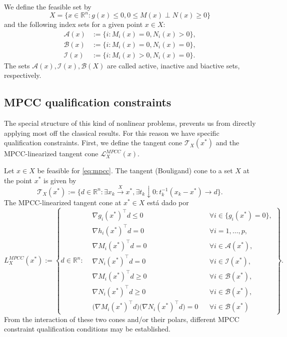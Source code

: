 \documentclass[review,onefignum,onetabnum]{siamonline190516}
\begin{document}
We define the feasible set by 
$$
X=\{x\in\mathbb{R}^n:g(x)\leq 0, 0\leq M(x)\perp N(x)\geq 0\}
$$
and the following index sets for a given point $x\in X:$
\begin{align*}
  \mathcal{A}(x)&:=\{i: M_i(x)=0, N_i(x)>0\},\\
  \mathcal{B}(x)&:=\{i:M_i(x)=0, N_i(x)=0\},\\
  \mathcal{I}(x)&:=\{i:M_i(x)>0, N_i(x)=0\}.
\end{align*}
The sets $\mathcal{A}(x), \mathcal{I}(x), \mathcal{B}(X)$ are called active, inactive and biactive sets, respectively. 

\subsection{MPCC qualification constraints} The special structure of this kind of nonlinear problems, prevents us from directly applying most off the classical results. For this reason we have specific qualification constraints. First, we define the tangent cone $\mathcal{T}_X(x^*)$ and the MPCC-linearized tangent cone $\mathcal{L}_X^{MPCC}(x).$

Let $x\in X$ be feasible for \eqref{eq:mpcc}. The tangent (Bouligand) cone to a set $X$ at the point $x^*$ is given by
$$
\mathcal{T}_X(x^*):=\{d\in\mathbb{R}^n:\exists x_k\xrightarrow{X} x^*, \exists t_k\downarrow 0: t_k^{-1}(x_k-x^*)\to d\}.
$$
The MPCC-linearized tangent cone at $x^*\in X$ está dado por
\[
L_X^{MPCC}(x^*) := \left\{ d \in \mathbb{R}^n :
\begin{aligned}
& \nabla g_i(x^*)^\top d \leq 0 && \forall i \in \{ g_i(x^*) = 0 \}, \\
& \nabla h_i(x^*)^\top d = 0 && \forall i = 1, \ldots, p, \\
& \nabla M_i(x^*)^\top d = 0 && \forall i \in \mathcal{A}(x^*), \\
& \nabla N_i(x^*)^\top d = 0 && \forall i \in \mathcal{I}(x^*), \\
& \nabla M_i(x^*)^\top d \geq 0 && \forall i \in \mathcal{B}(x^*), \\
& \nabla N_i(x^*)^\top d \geq 0 && \forall i \in \mathcal{B}(x^*), \\
& \big(\nabla M_i(x^*)^\top d\big)\big(\nabla N_i(x^*)^\top d\big) = 0 
&& \forall i \in \mathcal{B}(x^*)
\end{aligned}
\right\}.
\]
From the interaction of these two cones and/or their polars, different MPCC constraint qualification conditions may be established. 
\end{document}
